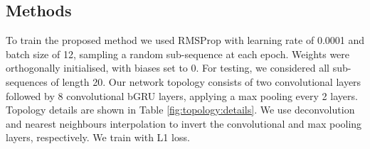 \documentclass[runningheads]{llncs}
\begin{document}
\subsection{Methods}
\label{sec:experiments:methods}

To train the proposed method we used RMSProp with learning rate of 0.0001 and batch size of 12, sampling a random sub-sequence at each epoch. Weights were orthogonally initialised, with biases set to 0. For testing, we considered all sub-sequences of length 20. Our network topology consists of two convolutional layers followed by 8 convolutional bGRU layers, applying a  max pooling every 2 layers. Topology details are shown in Table \ref{fig:topology:details}. We use deconvolution and nearest neighbours interpolation to invert the convolutional and max pooling layers, respectively. We train with L1 loss.

\begin{table}[t!]
    \centering
    \vspace{0.5mm}
    \caption{Parameters of the topology used for the experiments. The decoder applies the same topology in reverse, using nearest neighbours interpolation and  transposed convolutions to revert the pooling and convolutional layers.}
    \label{fig:topology:details}\vspace{-0.5cm}
\end{table}
\end{document}
